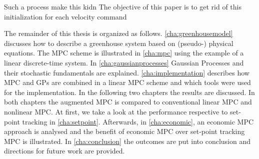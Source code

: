 Such a process make this kidn
The objective of this paper is to get rid of this initialization for each velocity command


The remainder of this thesis is organized as follows.
\cref{cha:greenhousemodel} discusses how to describe a greenhouse system based on (pseudo-) physical equations.
The MPC scheme is illustrated in \cref{cha:mpc} using the example of a linear discrete-time system.
In \cref{cha:gaussianprocesses} Gaussian Processes and their stochastic fundamentals are explained.
\cref{cha:implementation} describes how MPC and GPs are combined in a linear MPC scheme and which tools were used for the implementation.
In the following two chapters the results are discussed.
In both chapters the augmented MPC is compared to conventional linear MPC and nonlinear MPC.
At first, we take a look at the performance respective to set-point tracking in \cref{cha:setpoint}.
Afterwards, in \cref{cha:economic}, an economic MPC approach is analysed and the benefit of economic MPC over set-point tracking MPC is illustrated.
In \cref{cha:conclusion} the outcomes are put into conclusion and directions for future work are provided.